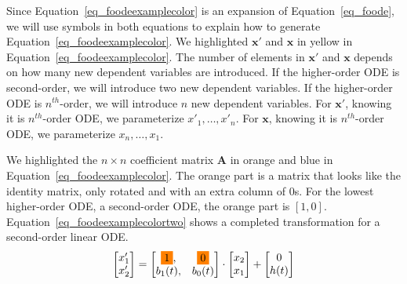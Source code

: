 Since Equation~\ref{eq_foodeexamplecolor} is an expansion of Equation~\ref{eq_foode}, we will use symbols in both equations to explain how to generate Equation~\ref{eq_foodeexamplecolor}. We highlighted $\boldsymbol{x'}$ and $\boldsymbol{x}$ in yellow in Equation~\ref{eq_foodeexamplecolor}. The number of elements in $\boldsymbol{x'}$ and $\boldsymbol{x}$ depends on how many new dependent variables are introduced. If the higher-order ODE is second-order, we will introduce two new dependent variables. If the higher-order ODE is $n^{th}$-order, we will introduce $n$ new dependent variables. For $\boldsymbol{x'}$, knowing it is $n^{th}$-order ODE, we parameterize $x'_{1}, \dots, x'_{n}$. For $\boldsymbol{x}$, knowing it is $n^{th}$-order ODE, we parameterize $x_{n}, \dots, x_{1}$.

We highlighted the $n \times n$ coefficient matrix $\boldsymbol{A}$ in orange and blue in Equation~\ref{eq_foodeexamplecolor}. The orange part is a matrix that looks like the identity matrix, only rotated and with an extra column of 0s. For the lowest higher-order ODE, a second-order ODE, the orange part is $[1, 0]$. Equation~\ref{eq_foodeexamplecolortwo} shows a completed transformation for a second-order linear ODE.
\begin{equation} \label{eq_foodeexamplecolortwo}
	\begin{bmatrix}
		{x_{1}'} \\
    {x_{2}'} 
	\end{bmatrix}
    = 
  \begin{bmatrix}
		\highlight{orange}{1}, & \highlight{orange}{0} \\
    {b_{1}(t)}, & {b_{0}(t)}
	\end{bmatrix}
    \cdot
  \begin{bmatrix}
		{x_{2}} \\
    {x_{1}} 
	\end{bmatrix}
    + 
  \begin{bmatrix}
    {0} \\
    {h(t)}
	\end{bmatrix}
\end{equation}

